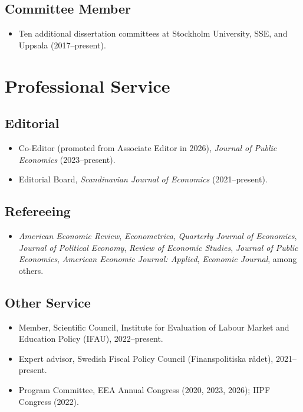 \documentclass[11pt]{article}
\newcommand{\UPD}[1]{\textcolor{updorange}{#1}}%
\newcommand{\UPD}[1]{#1}%
\begin{document}
\subsection{Committee Member}
\begin{itemize}
\item \UPD{Ten additional dissertation committees at Stockholm University, SSE, and Uppsala (2017--present).}
\end{itemize}

\section{Professional Service}
\subsection{Editorial}
\begin{itemize}
\item \UPD{Co-Editor (promoted from Associate Editor in 2026), \emph{Journal of Public Economics} (2023--present).}
\item Editorial Board, \emph{Scandinavian Journal of Economics} (2021--present).
\end{itemize}
\subsection{Refereeing}
\begin{itemize}
\item \emph{American Economic Review}, \emph{Econometrica}, \emph{Quarterly Journal of Economics},
\emph{Journal of Political Economy}, \emph{Review of Economic Studies}, \emph{Journal of Public Economics},
\emph{American Economic Journal: Applied}, \emph{Economic Journal}, among others.
\end{itemize}
\subsection{Other Service}
\begin{itemize}
\item Member, Scientific Council, Institute for Evaluation of Labour Market and Education Policy (IFAU), 2022--present.
\item Expert advisor, Swedish Fiscal Policy Council (Finanspolitiska r\aa det), 2021--present.
\item \UPD{Program Committee, EEA Annual Congress (2020, 2023, 2026); IIPF Congress (2022).}
\end{itemize}
\end{document}
